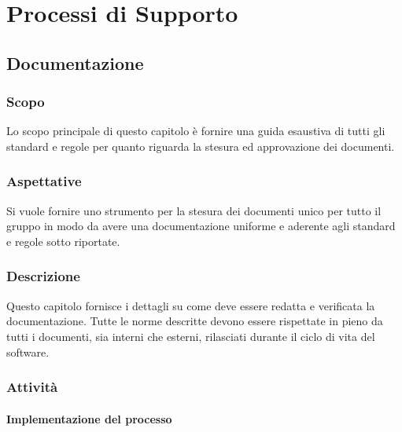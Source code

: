 \section{Processi di Supporto}

	\subsection{Documentazione}

		\subsubsection{Scopo}
			Lo scopo principale di questo capitolo è fornire una guida esaustiva di tutti gli standard e regole per quanto riguarda la stesura ed approvazione dei documenti.
		\subsubsection{Aspettative}
			Si vuole fornire uno strumento per la stesura dei documenti unico per tutto il gruppo in modo da avere una documentazione uniforme e aderente agli standard e regole sotto riportate.
		\subsubsection{Descrizione}
			Questo capitolo fornisce i dettagli su come deve essere redatta e verificata la documentazione. Tutte le norme descritte devono essere rispettate in pieno da tutti i documenti, sia interni che esterni, rilasciati durante il ciclo di vita del software.
		\subsubsection{Attività}
			\paragraph{Implementazione del processo}


